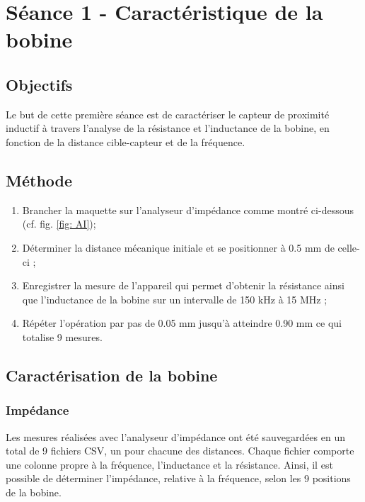 

\section{Séance 1 - Caractéristique de la bobine }

\subsection{Objectifs}

Le but de cette première séance est de caractériser le capteur de proximité inductif à travers 
l’analyse de la résistance et l'inductance de la bobine, en fonction de la distance cible-capteur 
 et de la fréquence. 

\subsection{Méthode}

\begin{enumerate}
    \item Brancher la maquette sur l'analyseur d'impédance comme montré ci-dessous (cf. fig. \ref{fig: AI});
    \item Déterminer la distance mécanique initiale et se positionner à 0.5 mm de celle-ci ;
    \item Enregistrer la mesure de l'appareil qui permet d'obtenir la résistance ainsi que l'inductance de 
    la bobine sur un intervalle de 150 kHz à 15 MHz ;
    \item Répéter l'opération par pas de 0.05 mm jusqu'à atteindre 0.90 mm ce qui totalise 9 mesures.
\end{enumerate}


\subsection{Caractérisation de la bobine}

\subsubsection{Impédance}


Les mesures réalisées avec l'analyseur d'impédance ont été sauvegardées en un total
de 9 fichiers CSV, un pour chacune des distances. Chaque fichier comporte une colonne propre à
la fréquence, l'inductance et la résistance. Ainsi, il est possible de déterminer l'impédance, relative
à la fréquence, selon les 9 positions de la bobine.\\


